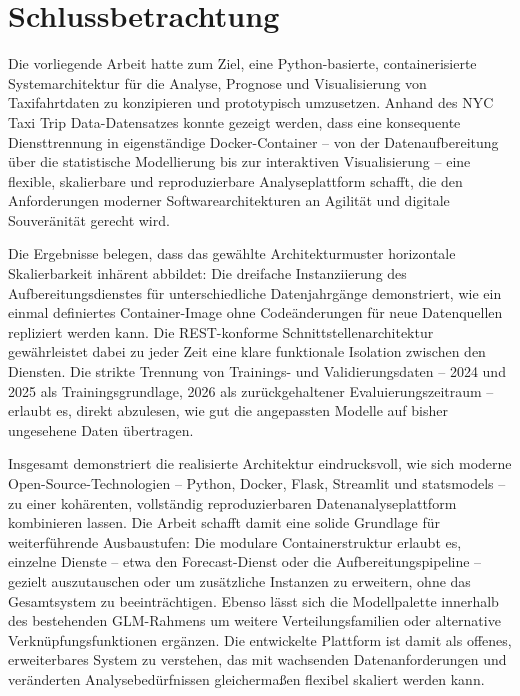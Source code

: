 \chapter{Schlussbetrachtung}

Die vorliegende Arbeit hatte zum Ziel, eine Python-basierte, containerisierte Systemarchitektur für die Analyse, Prognose und Visualisierung von Taxifahrtdaten zu konzipieren und prototypisch umzusetzen. Anhand des NYC Taxi Trip Data-Datensatzes konnte gezeigt werden, dass eine konsequente Diensttrennung in eigenständige Docker-Container -- von der Datenaufbereitung über die statistische Modellierung bis zur interaktiven Visualisierung -- eine flexible, skalierbare und reproduzierbare Analyseplattform schafft, die den Anforderungen moderner Softwarearchitekturen an Agilität und digitale Souveränität gerecht wird.

Die Ergebnisse belegen, dass das gewählte Architekturmuster horizontale Skalierbarkeit inhärent abbildet: Die dreifache Instanziierung des Aufbereitungsdienstes für unterschiedliche Datenjahrgänge demonstriert, wie ein einmal definiertes Container-Image ohne Codeänderungen für neue Datenquellen repliziert werden kann. Die REST-konforme Schnittstellenarchitektur gewährleistet dabei zu jeder Zeit eine klare funktionale Isolation zwischen den Diensten. Die strikte Trennung von Trainings- und Validierungsdaten -- 2024 und 2025 als Trainingsgrundlage, 2026 als zurückgehaltener Evaluierungszeitraum -- erlaubt es, direkt abzulesen, wie gut die angepassten Modelle auf bisher ungesehene Daten übertragen.

Insgesamt demonstriert die realisierte Architektur eindrucksvoll, wie sich moderne Open-Source-Technologien -- Python, Docker, Flask, Streamlit und statsmodels -- zu einer kohärenten, vollständig reproduzierbaren Datenanalyseplattform kombinieren lassen. Die Arbeit schafft damit eine solide Grundlage für weiterführende Ausbaustufen: Die modulare Containerstruktur erlaubt es, einzelne Dienste -- etwa den Forecast-Dienst oder die Aufbereitungspipeline -- gezielt auszutauschen oder um zusätzliche Instanzen zu erweitern, ohne das Gesamtsystem zu beeinträchtigen. Ebenso lässt sich die Modellpalette innerhalb des bestehenden GLM-Rahmens um weitere Verteilungsfamilien oder alternative Verknüpfungsfunktionen ergänzen. Die entwickelte Plattform ist damit als offenes, erweiterbares System zu verstehen, das mit wachsenden Datenanforderungen und veränderten Analysebedürfnissen gleichermaßen flexibel skaliert werden kann.
